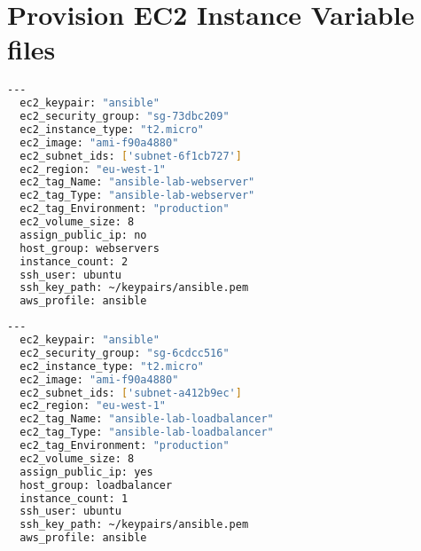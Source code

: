 \section{Provision EC2 Instance Variable files} \label{provision-vars}

\begin{minipage}{\textwidth}
  \begin{lstlisting}[caption={provision-ec2-instance/vars/webserver.yml},label=webserver-vars,language=bash]
  ---
  ec2_keypair: "ansible"
  ec2_security_group: "sg-73dbc209"
  ec2_instance_type: "t2.micro"
  ec2_image: "ami-f90a4880"
  ec2_subnet_ids: ['subnet-6f1cb727']
  ec2_region: "eu-west-1"
  ec2_tag_Name: "ansible-lab-webserver"
  ec2_tag_Type: "ansible-lab-webserver"
  ec2_tag_Environment: "production"
  ec2_volume_size: 8
  assign_public_ip: no
  host_group: webservers
  instance_count: 2
  ssh_user: ubuntu
  ssh_key_path: ~/keypairs/ansible.pem
  aws_profile: ansible
\end{lstlisting}
\end{minipage}


\noindent
\begin{minipage}{\textwidth}
  \begin{lstlisting}[caption={provision-ec2-instance/vars/loadbalance.yml},label=loadbalancer-vars,language=bash]
  ---
  ec2_keypair: "ansible"
  ec2_security_group: "sg-6cdcc516"
  ec2_instance_type: "t2.micro"
  ec2_image: "ami-f90a4880"
  ec2_subnet_ids: ['subnet-a412b9ec']
  ec2_region: "eu-west-1"
  ec2_tag_Name: "ansible-lab-loadbalancer"
  ec2_tag_Type: "ansible-lab-loadbalancer"
  ec2_tag_Environment: "production"
  ec2_volume_size: 8
  assign_public_ip: yes
  host_group: loadbalancer
  instance_count: 1
  ssh_user: ubuntu
  ssh_key_path: ~/keypairs/ansible.pem
  aws_profile: ansible
  \end{lstlisting}
\end{minipage}